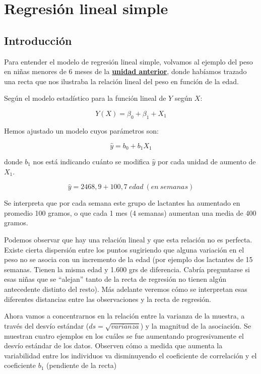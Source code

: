\documentclass[
  spanish,
  a4paper,
]{scrbook}
\begin{document}

\chapter{Regresión lineal simple}\label{regresiuxf3n-lineal-simple}

\section{Introducción}\label{introducciuxf3n-13}

Para entender el modelo de regresión lineal simple, volvamos al ejemplo
del peso en niñas menores de 6 meses de la
\hyperref[ejemplo-pruxe1ctico-en-r]{\textbf{unidad anterior}}, donde
habíamos trazado una recta que nos ilustraba la relación lineal del peso
en función de la edad.

Según el modelo estadístico para la función lineal de \(Y\) según \(X\):

\[
Y(X) =  \beta_0 + \beta_1 + X_1
\]

Hemos ajustado un modelo cuyos parámetros son:

\[
\hat{y} = b_0 + b_1X_1
\]

donde \(b_1\) nos está indicando cuánto se modifica \(\hat{y}\) por cada
unidad de aumento de \(X_1\).

\[
\hat{y} = 2468,9 + 100,7 \: edad \: (en \: semanas) 
\]

Se interpreta que por cada semana este grupo de lactantes ha aumentado
en promedio 100 gramos, o que cada 1 mes (4 semanas) aumentan una media
de 400 gramos.

Podemos observar que hay una relación lineal y que esta relación no es
perfecta. Existe cierta dispersión entre los puntos sugiriendo que
alguna variación en el peso no se asocia con un incremento de la edad
(por ejemplo dos lactantes de 15 semanas. Tienen la misma edad y 1.600
grs de diferencia. Cabría preguntarse si esas niñas que se ``alejan''
tanto de la recta de regresión no tienen algún antecedente distinto del
resto). Más adelante veremos cómo se interpretan esas diferentes
distancias entre las observaciones y la recta de regresión.

Ahora vamos a concentrarnos en la relación entre la varianza de la
muestra, a través del desvío estándar (\(ds = \sqrt{varianza}\)) y la
magnitud de la asociación. Se muestran cuatro ejemplos en los cuáles se
fue aumentando progresivamente el desvío estándar de los datos. Observen
cómo a medida que aumenta la variabilidad entre los individuos va
disminuyendo el coeficiente de correlación y el coeficiente \(b_1\)
(pendiente de la recta)
\end{document}

